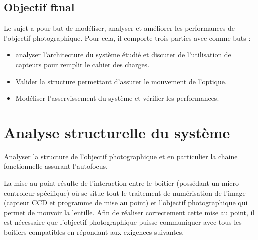 \subsection{Objectif ftnal}\label{objectif-ftnal}

Le sujet a pour but de modéliser, analyser et améliorer les performances
de l'objectif photographique. Pour cela, il comporte trois parties avec
comme buts :


\begin{itemize}
\item analyser l'architecture du système étudié et discuter de l'utilisation de capteurs pour remplir le cahier des charges.
\item Valider la structure permettant d'assurer le mouvement de l'optique.
\item Modéliser l'asservissement du système et vérifier les performances.
\end{itemize}

%

\fi
\section{Analyse structurelle du système}

\begin{obj}
Analyser la structure de l'objectif photographique et en particulier la chaine fonctionnelle assurant l'autofocus.
\end{obj}
\ifprof
\else
La mise au point résulte de l'interaction entre le boitier (possédant un micro-controleur spécifique) où se situe
tout le traitement de numérisation de l'image (capteur CCD et programme
de mise au point) et l'objectif photographique qui permet de mouvoir la
lentille. Afin de réaliser correctement cette mise au point, il est
nécessaire que l'objectif photographique puisse communiquer avec tous
les boitiers compatibles en répondant aux exigences suivantes.

